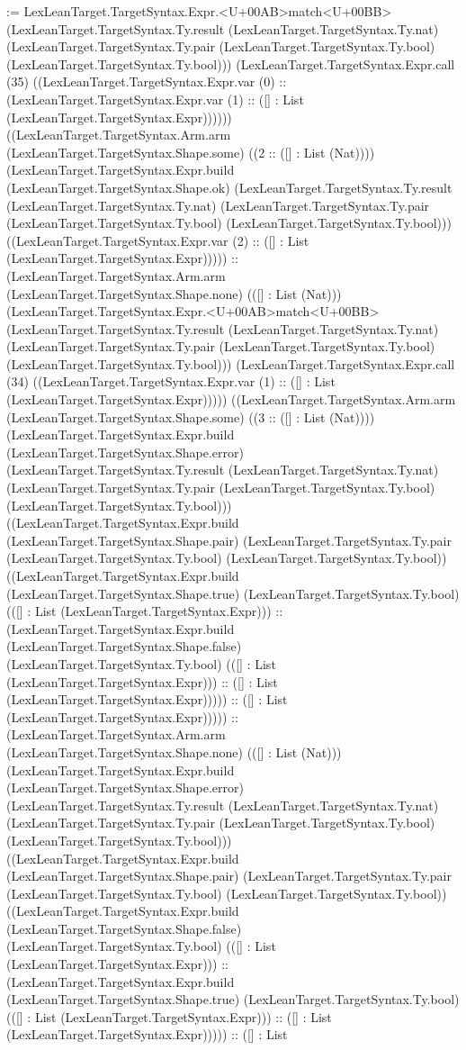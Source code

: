\documentclass[11pt]{article}
\begin{document}
:= LexLeanTarget.TargetSyntax.Expr.<U+00AB>match<U+00BB> (LexLeanTarget.TargetSyntax.Ty.result (LexLeanTarget.TargetSyntax.Ty.nat) (LexLeanTarget.TargetSyntax.Ty.pair (LexLeanTarget.TargetSyntax.Ty.bool) (LexLeanTarget.TargetSyntax.Ty.bool))) (LexLeanTarget.TargetSyntax.Expr.call (35) ((LexLeanTarget.TargetSyntax.Expr.var (0) :: (LexLeanTarget.TargetSyntax.Expr.var (1) :: ([] : List (LexLeanTarget.TargetSyntax.Expr)))))) ((LexLeanTarget.TargetSyntax.Arm.arm (LexLeanTarget.TargetSyntax.Shape.some) ((2 :: ([] : List (Nat)))) (LexLeanTarget.TargetSyntax.Expr.build (LexLeanTarget.TargetSyntax.Shape.ok) (LexLeanTarget.TargetSyntax.Ty.result (LexLeanTarget.TargetSyntax.Ty.nat) (LexLeanTarget.TargetSyntax.Ty.pair (LexLeanTarget.TargetSyntax.Ty.bool) (LexLeanTarget.TargetSyntax.Ty.bool))) ((LexLeanTarget.TargetSyntax.Expr.var (2) :: ([] : List (LexLeanTarget.TargetSyntax.Expr))))) :: (LexLeanTarget.TargetSyntax.Arm.arm (LexLeanTarget.TargetSyntax.Shape.none) (([] : List (Nat))) (LexLeanTarget.TargetSyntax.Expr.<U+00AB>match<U+00BB> (LexLeanTarget.TargetSyntax.Ty.result (LexLeanTarget.TargetSyntax.Ty.nat) (LexLeanTarget.TargetSyntax.Ty.pair (LexLeanTarget.TargetSyntax.Ty.bool) (LexLeanTarget.TargetSyntax.Ty.bool))) (LexLeanTarget.TargetSyntax.Expr.call (34) ((LexLeanTarget.TargetSyntax.Expr.var (1) :: ([] : List (LexLeanTarget.TargetSyntax.Expr))))) ((LexLeanTarget.TargetSyntax.Arm.arm (LexLeanTarget.TargetSyntax.Shape.some) ((3 :: ([] : List (Nat)))) (LexLeanTarget.TargetSyntax.Expr.build (LexLeanTarget.TargetSyntax.Shape.error) (LexLeanTarget.TargetSyntax.Ty.result (LexLeanTarget.TargetSyntax.Ty.nat) (LexLeanTarget.TargetSyntax.Ty.pair (LexLeanTarget.TargetSyntax.Ty.bool) (LexLeanTarget.TargetSyntax.Ty.bool))) ((LexLeanTarget.TargetSyntax.Expr.build (LexLeanTarget.TargetSyntax.Shape.pair) (LexLeanTarget.TargetSyntax.Ty.pair (LexLeanTarget.TargetSyntax.Ty.bool) (LexLeanTarget.TargetSyntax.Ty.bool)) ((LexLeanTarget.TargetSyntax.Expr.build (LexLeanTarget.TargetSyntax.Shape.true) (LexLeanTarget.TargetSyntax.Ty.bool) (([] : List (LexLeanTarget.TargetSyntax.Expr))) :: (LexLeanTarget.TargetSyntax.Expr.build (LexLeanTarget.TargetSyntax.Shape.false) (LexLeanTarget.TargetSyntax.Ty.bool) (([] : List (LexLeanTarget.TargetSyntax.Expr))) :: ([] : List (LexLeanTarget.TargetSyntax.Expr))))) :: ([] : List (LexLeanTarget.TargetSyntax.Expr))))) :: (LexLeanTarget.TargetSyntax.Arm.arm (LexLeanTarget.TargetSyntax.Shape.none) (([] : List (Nat))) (LexLeanTarget.TargetSyntax.Expr.build (LexLeanTarget.TargetSyntax.Shape.error) (LexLeanTarget.TargetSyntax.Ty.result (LexLeanTarget.TargetSyntax.Ty.nat) (LexLeanTarget.TargetSyntax.Ty.pair (LexLeanTarget.TargetSyntax.Ty.bool) (LexLeanTarget.TargetSyntax.Ty.bool))) ((LexLeanTarget.TargetSyntax.Expr.build (LexLeanTarget.TargetSyntax.Shape.pair) (LexLeanTarget.TargetSyntax.Ty.pair (LexLeanTarget.TargetSyntax.Ty.bool) (LexLeanTarget.TargetSyntax.Ty.bool)) ((LexLeanTarget.TargetSyntax.Expr.build (LexLeanTarget.TargetSyntax.Shape.false) (LexLeanTarget.TargetSyntax.Ty.bool) (([] : List (LexLeanTarget.TargetSyntax.Expr))) :: (LexLeanTarget.TargetSyntax.Expr.build (LexLeanTarget.TargetSyntax.Shape.true) (LexLeanTarget.TargetSyntax.Ty.bool) (([] : List (LexLeanTarget.TargetSyntax.Expr))) :: ([] : List (LexLeanTarget.TargetSyntax.Expr))))) :: ([] : List 
\end{document}
